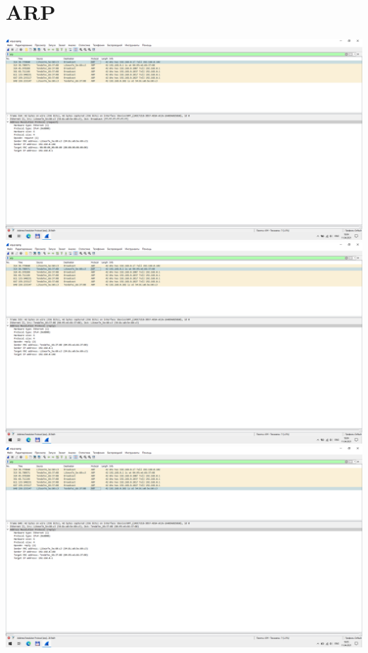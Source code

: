 \section{ARP}
\includegraphics{screenshots/arp_request_1}
\includegraphics{screenshots/arp_response_1}
\includegraphics{screenshots/arp_setup_1}
